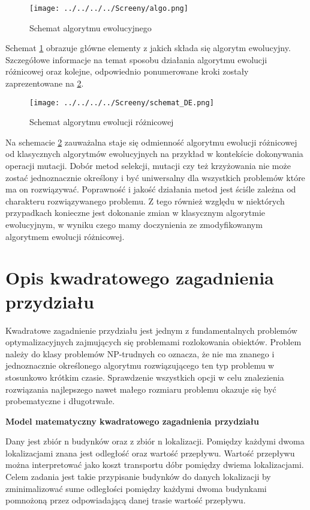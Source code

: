 \begin{figure}[h!]
\begin{center}
		\texttt{[image: ../../../../Screeny/algo.png]}
		\caption{Schemat algorytmu ewolucyjnego}
		\label{algo}		
\end{center}	
\end{figure}

Schemat \ref{algo} obrazuje główne elementy z jakich składa się algorytm ewolucyjny. Szczegółowe informacje na temat sposobu działania algorytmu ewolucji różnicowej oraz kolejne, odpowiednio ponumerowane kroki zostały zaprezentowane na \ref{algode}.

\begin{figure}[h!]
\begin{center}
		\texttt{[image: ../../../../Screeny/schemat\_DE.png]}
		\caption{Schemat algorytmu ewolucji różnicowej \cite{doktorat}}
		\label{algode}		
\end{center}	
\end{figure}

Na schemacie \ref{algode} zauważalna staje się odmienność algorytmu ewolucji różnicowej od klasycznych algorytmów ewolucyjnych na przykład w kontekście dokonywania operacji mutacji.
Dobór metod selekcji, mutacji czy też krzyżowania nie może zostać jednoznacznie określony i być uniwersalny dla wszystkich problemów które ma on rozwiązywać. Poprawność i jakość działania metod jest ściśle zależna od charakteru rozwiązywanego problemu. Z tego również względu w niektórych przypadkach konieczne jest dokonanie zmian w klasycznym algorytmie ewolucyjnym, w wyniku czego mamy doczynienia ze zmodyfikowanym algorytmem ewolucji różnicowej.

\section{Opis kwadratowego zagadnienia przydziału}\label{sec:strukturaDokumentu}

Kwadratowe zagadnienie przydziału jest jednym z fundamentalnych problemów optymalizacyjnych zajmujących się problemami rozlokowania obiektów. Problem należy do klasy problemów NP-trudnych co oznacza, że nie ma znanego i jednoznacznie określonego algorytmu rozwiązującego ten typ problemu w stosunkowo krótkim czasie. Sprawdzenie wszystkich opcji w celu znalezienia rozwiązania najlepszego nawet małego rozmiaru problemu okazuje się być probematyczne i długotrwałe.\\
\par
\textbf{Model matematyczny kwadratowego zagadnienia przydziału}\\
\par
Dany jest zbiór n budynków oraz z zbiór n lokalizacji. Pomiędzy każdymi dwoma lokalizacjami znana jest odległość oraz wartość przepływu. Wartość przepływu można interpretować jako koszt transportu dóbr pomiędzy dwiema lokalizacjami. Celem zadania jest takie przypisanie budynków do danych lokalizacji by zminimalizować sume odległości pomiędzy każdymi dwoma budynkami pomnożoną przez odpowiadającą danej trasie wartość przepływu.

